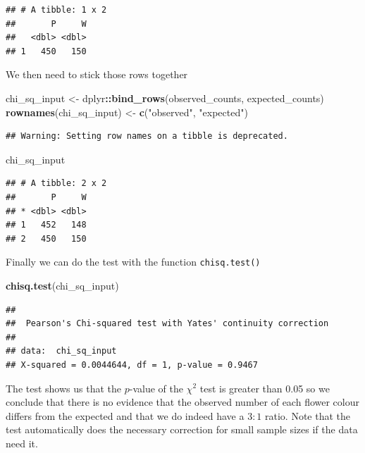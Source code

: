 \documentclass[
]{book}
\newenvironment{Shaded}{\begin{snugshade}}{\end{snugshade}}
\newcommand{\KeywordTok}[1]{\textcolor[rgb]{0.13,0.29,0.53}{\textbf{#1}}}
\newcommand{\NormalTok}[1]{#1}
\newcommand{\OperatorTok}[1]{\textcolor[rgb]{0.81,0.36,0.00}{\textbf{#1}}}
\newcommand{\StringTok}[1]{\textcolor[rgb]{0.31,0.60,0.02}{#1}}
\begin{document}
\begin{verbatim}
## # A tibble: 1 x 2
##       P     W
##   <dbl> <dbl>
## 1   450   150
\end{verbatim}

We then need to stick those rows together

\begin{Shaded}
\begin{Highlighting}[]
\NormalTok{chi_sq_input <-}\StringTok{ }\NormalTok{dplyr}\OperatorTok{::}\KeywordTok{bind_rows}\NormalTok{(observed_counts, expected_counts)}
\KeywordTok{rownames}\NormalTok{(chi_sq_input) <-}\StringTok{ }\KeywordTok{c}\NormalTok{(}\StringTok{"observed"}\NormalTok{, }\StringTok{"expected"}\NormalTok{)}
\end{Highlighting}
\end{Shaded}

\begin{verbatim}
## Warning: Setting row names on a tibble is deprecated.
\end{verbatim}

\begin{Shaded}
\begin{Highlighting}[]
\NormalTok{chi_sq_input}
\end{Highlighting}
\end{Shaded}

\begin{verbatim}
## # A tibble: 2 x 2
##       P     W
## * <dbl> <dbl>
## 1   452   148
## 2   450   150
\end{verbatim}

Finally we can do the test with the function \texttt{chisq.test()}

\begin{Shaded}
\begin{Highlighting}[]
\KeywordTok{chisq.test}\NormalTok{(chi_sq_input)}
\end{Highlighting}
\end{Shaded}

\begin{verbatim}
## 
## 	Pearson's Chi-squared test with Yates' continuity correction
## 
## data:  chi_sq_input
## X-squared = 0.0044644, df = 1, p-value = 0.9467
\end{verbatim}

The test shows us that the \(p\)-value of the \(\chi^2\) test is greater than 0.05 so we conclude that there is no evidence that the observed number of each flower colour differs from the expected and that we do indeed have a \(3:1\) ratio. Note that the test automatically does the necessary correction for small sample sizes if the data need it.
\end{document}

